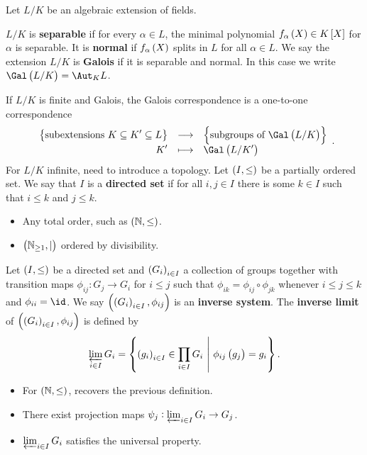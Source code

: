 
Let $ L / K $ be an algebraic extension of fields.

\begin{definition}
$ L / K $ is \textbf{separable} if for every $ \alpha \in L $, the minimal polynomial $ f_\alpha\br{X} \in K\sbr{X} $ for $ \alpha $ is separable. It is \textbf{normal} if $ f_\alpha\br{X} $ splits in $ L $ for all $ \alpha \in L $. We say the extension $ L / K $ is \textbf{Galois} if it is separable and normal. In this case we write $ \Gal\br{L / K} = \Aut_K L $.
\end{definition}

If $ L / K $ is finite and Galois, the Galois correspondence is a one-to-one correspondence
$$ \function{\cbr{\text{subextensions} \ K \subseteq K' \subseteq L}}{\cbr{\text{subgroups of} \ \Gal\br{L / K}}}{K'}{\Gal\br{L / K'}}. $$
For $ L / K $ infinite, need to introduce a topology. Let $ \br{I, \le} $ be a partially ordered set. We say that $ I $ is a \textbf{directed set} if for all $ i, j \in I $ there is some $ k \in I $ such that $ i \le k $ and $ j \le k $.

\begin{example*}
\hfill
\begin{itemize}
\item Any total order, such as $ \br{\NN, \le} $.
\item $ \br{\NN_{\ge 1}, \mid} $ ordered by divisibility.
\end{itemize}
\end{example*}

\begin{definition}
Let $ \br{I, \le} $ be a directed set and $ \br{G_i}_{i \in I} $ a collection of groups together with transition maps $ \phi_{ij} : G_j \to G_i $ for $ i \le j $ such that $ \phi_{ik} = \phi_{ij} \circ \phi_{jk} $ whenever $ i \le j \le k $ and $ \phi_{ii} = \id $. We say $ \br{\br{G_i}_{i \in I}, \phi_{ij}} $ is an \textbf{inverse system}. The \textbf{inverse limit} of $ \br{\br{G_i}_{i \in I}, \phi_{ij}} $ is defined by
$$ \varprojlim_{i \in I} G_i = \cbr{\br{g_i}_{i \in I} \in \prod_{i \in I} G_i \st \phi_{ij}\br{g_j} = g_i}. $$
\end{definition}

\begin{remark*}
\hfill
\begin{itemize}
\item For $ \br{\NN, \le} $, recovers the previous definition.
\item There exist projection maps $ \psi_j : \varprojlim_{i \in I} G_i \to G_j $.
\item $ \varprojlim_{i \in I} G_i $ satisfies the universal property.
\end{itemize}
\end{remark*}

